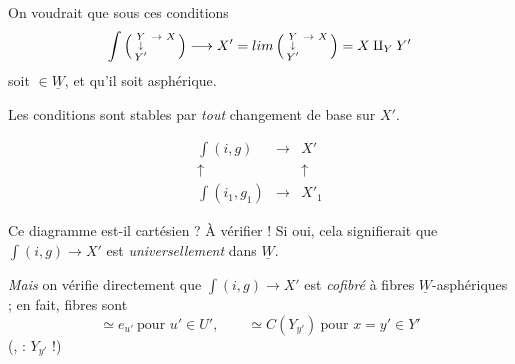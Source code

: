 \documentclass[11pt,a4paper]{article}
\begin{document}
On voudrait que sous ces conditions
\[
  \int \left(\begin{smallmatrix} Y & \to & X \\ \downarrow & & \\ Y' & & \end{smallmatrix}\right)
  \longrightarrow X' = \varinjlim \left(\begin{smallmatrix} Y & \to & X \\ \downarrow & & \\ Y' & & \end{smallmatrix}\right) = X \amalg_Y Y'
\]
soit $\in \underline{W}$, et  qu'il soit asphérique.

Les conditions sont  stables par \emph{tout} changement de base sur $X'$.

\[
  \begin{array}{ccc}
    \int(i, g) & \longrightarrow & X' \\
    \uparrow & & \uparrow \\
    \int(i_1, g_1) & \longrightarrow & X'_1
  \end{array}
\]

Ce diagramme est-il cartésien ? À vérifier ! Si oui, cela signifierait que $\int(i, g) \to X'$ est \emph{universellement} dans $\underline{W}$.

\emph{Mais} on vérifie directement que $\int(i, g) \to X'$ est \emph{cofibré} à fibres $\underline{W}$-asphériques ; en fait, fibres sont
\[
  \simeq e_{u'} \ \text{pour } u' \in U', \qquad
  \simeq C(Y_{y'}) \ \text{pour } x = y' \in Y'
\]
(, \ill{}  : $Y_{y'}$ !)


\end{document}
